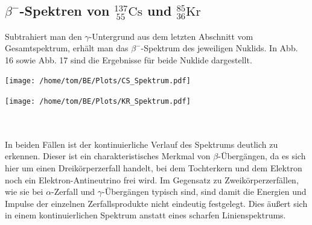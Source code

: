 \documentclass[german,  %
parskip=full,  %
]{scrartcl}
\begin{document}
\subsection{\(\beta^-\)-Spektren von \(^{137}_{\ 55}\mathrm{Cs}\) und \(^{85}_{36}\mathrm{Kr}\)}
Subtrahiert man den \(\gamma\)-Untergrund aus dem letzten Abschnitt vom Gesamtspektrum, erhält man das \(\beta^-\)-Spektrum des jeweiligen Nuklids. In Abb. 16 sowie Abb. 17 sind die Ergebnisse für beide Nuklide dargestellt.
\\
\begin{minipage}{0.5\textwidth}\centering
\texttt{[image: /home/tom/BE/Plots/CS\_Spektrum.pdf]}
\end{minipage}
\begin{minipage}{0.5\textwidth}\centering
\texttt{[image: /home/tom/BE/Plots/KR\_Spektrum.pdf]}
\end{minipage} \\\\
In beiden Fällen ist der kontinuierliche Verlauf des Spektrums deutlich zu erkennen. Dieser ist ein charakteristisches Merkmal von \(\beta\)-Übergängen, da es sich hier um einen Dreikörperzerfall handelt, bei dem Tochterkern und dem Elektron noch ein Elektron-Antineutrino frei wird. Im Gegensatz zu Zweikörperzerfällen, wie sie bei \(\alpha\)-Zerfall und \(\gamma\)-Übergängen typisch sind, sind damit die Energien und Impulse der einzelnen Zerfallsprodukte nicht eindeutig festgelegt. Dies äußert sich in einem kontinuierlichen Spektrum anstatt eines scharfen Linienspektrums. \\\\
\end{document}
